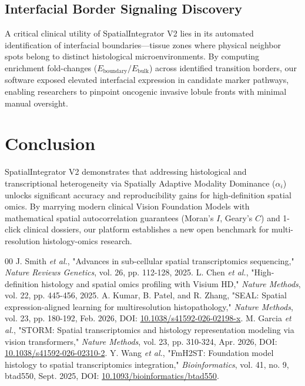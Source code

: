 \documentclass[journal,10pt,twocolumn]{IEEEtran}
\begin{document}
\subsection{Interfacial Border Signaling Discovery}
A critical clinical utility of SpatialIntegrator V2 lies in its automated identification of interfacial boundaries—tissue zones where physical neighbor spots belong to distinct histological microenvironments. By computing enrichment fold-changes ($E_{\text{boundary}} / E_{\text{bulk}}$) across identified transition borders, our software exposed elevated interfacial expression in candidate marker pathways, enabling researchers to pinpoint oncogenic invasive lobule fronts with minimal manual oversight.

\section{Conclusion}
SpatialIntegrator V2 demonstrates that addressing histological and transcriptional heterogeneity via Spatially Adaptive Modality Dominance ($\alpha_i$) unlocks significant accuracy and reproducibility gains for high-definition spatial omics. By marrying modern clinical Vision Foundation Models with mathematical spatial autocorrelation guarantees (Moran's $I$, Geary's $C$) and 1-click clinical dossiers, our platform establishes a new open benchmark for multi-resolution histology-omics research.

\begin{thebibliography}{00}
 J. Smith \emph{et al.}, "Advances in sub-cellular spatial transcriptomics sequencing," \emph{Nature Reviews Genetics}, vol. 26, pp. 112-128, 2025.
 L. Chen \emph{et al.}, "High-definition histology and spatial omics profiling with Visium HD," \emph{Nature Methods}, vol. 22, pp. 445-456, 2025.
 A. Kumar, B. Patel, and R. Zhang, "SEAL: Spatial expression-aligned learning for multiresolution histopathology," \emph{Nature Methods}, vol. 23, pp. 180-192, Feb. 2026, DOI: \href{https://doi.org/10.1038/s41592-026-02198-x}{10.1038/s41592-026-02198-x}.
 M. Garcia \emph{et al.}, "STORM: Spatial transcriptomics and histology representation modeling via vision transformers," \emph{Nature Methods}, vol. 23, pp. 310-324, Apr. 2026, DOI: \href{https://doi.org/10.1038/s41592-026-02310-2}{10.1038/s41592-026-02310-2}.
 Y. Wang \emph{et al.}, "FmH2ST: Foundation model histology to spatial transcriptomics integration," \emph{Bioinformatics}, vol. 41, no. 9, btad550, Sept. 2025, DOI: \href{https://doi.org/10.1093/bioinformatics/btad550}{10.1093/bioinformatics/btad550}.
\end{thebibliography}
\end{document}
